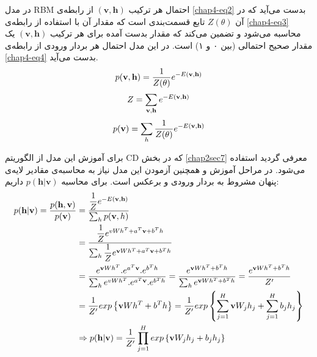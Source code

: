 در مدل
RBM
احتمال هر ترکیب
$(\textbf{v},\textbf{h})$
از رابطه‌ی
\ref{chap4-eq2}
بدست می‌‌آید که در آن
$Z(\theta)$
تابع قسمت‌بندی است که مقدار آن با استفاده از رابطه‌ی 
\ref{chap4-eq3}
محاسبه می‌شود و تضمین می‌کند که مقدار بدست آمده برای هر ترکیب
$(\textbf{v},\textbf{h})$
یک مقدار صحیح احتمالی‌ (بین ۰ و ۱) است. در این مدل احتمال هر بردار ورودی از رابطه‌ی
\ref{chap4-eq4}
بدست می‌‌آید.
\begin{align}
	\centering
	\label{chap4-eq2}
	p(\textbf{v},\textbf{h}) = \dfrac{1}{Z(\theta)} e^{-E(\textbf{v},\textbf{h})}
\end{align}
\begin{align}
	\centering
	\label{chap4-eq3}
	Z = \sum_{\textbf{v}, \textbf{h}}e^{-E(\textbf{v},\textbf{h})}
\end{align}
\begin{align}
	\centering
	\label{chap4-eq4}
	p(\textbf{v}) = \sum_{h} \dfrac{1}{Z(\theta)} e^{-E(\textbf{v},\textbf{h})}
\end{align}

برای آموزش این مدل از الگوریتم
CD
که در بخش
\ref{chap2sec7}
معرفی‌ گردید استفاده می‌‌شود. در مراحل آموزش و همچنین آزمودن این مدل نیاز به محاسبه‌ی مقادیر لایه‌ی پنهان مشروط به بردار ورودی و برعکس است. برای محاسبه
$p(\textbf{h}|\textbf{v})$
داریم:
\begin{align}
	\centering
	\label{chap4-eq5}
	p(\textbf{h}|\textbf{v})=\dfrac{p(\textbf{h},\textbf{v})}{p(\textbf{v})} &=\dfrac{\dfrac{1}{Z}e^{-E(\textbf{v},\textbf{h})}}{\sum_{h}p(\textbf{v},h)}\\\nonumber
								&=\dfrac{\dfrac{1}{Z}e^{vWh^{T}+a^{T}\textbf{v}+b^{T}h}}{\sum_{h}\dfrac{1}{Z}e^{\textbf{v}Wh^{T}+a^{T}\textbf{v}+b^{T}h}}\\\nonumber
								&=\dfrac{e^{\textbf{v}Wh^{T}}.e^{a^{T}\textbf{v}}.e^{b^{T}h}}{\sum_{h}e^{vWh^{T}}.e^{a^{T}\textbf{v}}.e^{b^{T}h}}
								=\dfrac{e^{\textbf{v}Wh^{T}+b^{T}h}}{\sum_{h}e^{\textbf{v}Wh^{T}+b^{T}h}}
								=\dfrac{e^{\textbf{v}Wh^{T}+b^{T}h}}{Z'}\\\nonumber
								&=\dfrac{1}{Z'}exp\left\lbrace \textbf{v}Wh^{T}+b^{T}h\right\rbrace
								=\dfrac{1}{Z'}exp \left\lbrace \sum_{j=1}^{H}\textbf{v}W_jh_j + \sum_{j=1}^{H}b_jh_j \right\rbrace\\\nonumber
								&\Rightarrow p(\textbf{h}|\textbf{v})=\dfrac{1}{Z'}\prod_{j=1}^{H}exp\left\lbrace \textbf{v}W_jh_j + b_jh_j \right\rbrace
\end{align}

